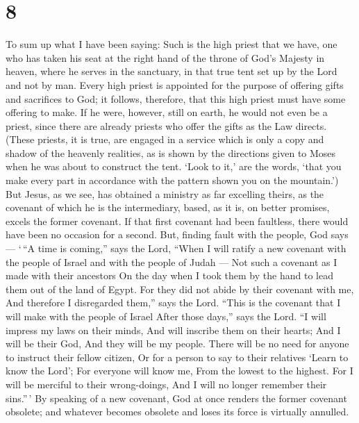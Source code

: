 \hypertarget{section-7}{%
\section{8}\label{section-7}}

 To sum up what I have been saying: Such is the high priest
that we have, one who has taken his seat at the right hand of the throne
of God's Majesty in heaven,  where he serves in the
sanctuary, in that true tent set up by the Lord and not by man.
 Every high priest is appointed for the purpose of offering
gifts and sacrifices to God; it follows, therefore, that this high
priest must have some offering to make.  If he were,
however, still on earth, he would not even be a priest, since there are
already priests who offer the gifts as the Law directs. 
(These priests, it is true, are engaged in a service which is only a
copy and shadow of the heavenly realities, as is shown by the directions
given to Moses when he was about to construct the tent. `Look to it,'
are the words, `that you make every part in accordance with the pattern
shown you on the mountain.')  But Jesus, as we see, has
obtained a ministry as far excelling theirs, as the covenant of which he
is the intermediary, based, as it is, on better promises, excels the
former covenant.  If that first covenant had been faultless,
there would have been no occasion for a second.  But,
finding fault with the people, God says --- `\,``A time is coming,''
says the Lord, ``When I will ratify a new covenant with the people of
Israel and with the people of Judah ---  Not such a covenant
as I made with their ancestors On the day when I took them by the hand
to lead them out of the land of Egypt. For they did not abide by their
covenant with me, And therefore I disregarded them,'' says the Lord.
 ``This is the covenant that I will make with the people of
Israel After those days,'' says the Lord. ``I will impress my laws on
their minds, And will inscribe them on their hearts; And I will be their
God, And they will be my people.  There will be no need for
anyone to instruct their fellow citizen, Or for a person to say to their
relatives `Learn to know the Lord'; For everyone will know me, From the
lowest to the highest.  For I will be merciful to their
wrong-doings, And I will no longer remember their sins.''\,'
 By speaking of a new covenant, God at once renders the
former covenant obsolete; and whatever becomes obsolete and loses its
force is virtually annulled.

